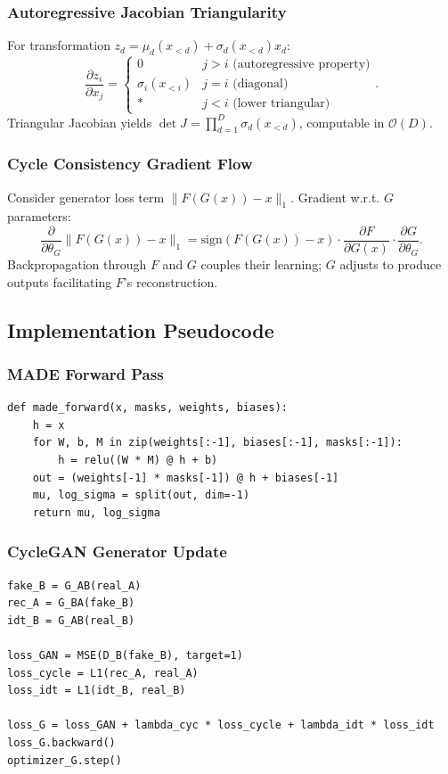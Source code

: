\documentclass[conference]{IEEEtran}
\begin{document}
\subsubsection{Autoregressive Jacobian Triangularity}
For transformation $z_d = \mu_d(x_{<d}) + \sigma_d(x_{<d}) x_d$:
\begin{equation}
\frac{\partial z_i}{\partial x_j} = \begin{cases}
0 & j > i \text{ (autoregressive property)} \\
\sigma_i(x_{<i}) & j = i \text{ (diagonal)} \\
* & j < i \text{ (lower triangular)}
\end{cases}.
\end{equation}
Triangular Jacobian yields $\det J = \prod_{d=1}^{D} \sigma_d(x_{<d})$, computable in $\mathcal{O}(D)$.

\subsubsection{Cycle Consistency Gradient Flow}
Consider generator loss term $\|F(G(x)) - x\|_1$. Gradient w.r.t. $G$ parameters:
\begin{equation}
\frac{\partial}{\partial \theta_G} \|F(G(x)) - x\|_1 = \text{sign}(F(G(x)) - x) \cdot \frac{\partial F}{\partial G(x)} \cdot \frac{\partial G}{\partial \theta_G}.
\end{equation}
Backpropagation through $F$ and $G$ couples their learning; $G$ adjusts to produce outputs facilitating $F$'s reconstruction.

\subsection{Implementation Pseudocode}
\subsubsection{MADE Forward Pass}
\begin{verbatim}
def made_forward(x, masks, weights, biases):
    h = x
    for W, b, M in zip(weights[:-1], biases[:-1], masks[:-1]):
        h = relu((W * M) @ h + b)
    out = (weights[-1] * masks[-1]) @ h + biases[-1]
    mu, log_sigma = split(out, dim=-1)
    return mu, log_sigma
\end{verbatim}

\subsubsection{CycleGAN Generator Update}
\begin{verbatim}
fake_B = G_AB(real_A)
rec_A = G_BA(fake_B)
idt_B = G_AB(real_B)

loss_GAN = MSE(D_B(fake_B), target=1)
loss_cycle = L1(rec_A, real_A)
loss_idt = L1(idt_B, real_B)

loss_G = loss_GAN + lambda_cyc * loss_cycle + lambda_idt * loss_idt
loss_G.backward()
optimizer_G.step()
\end{verbatim}
\end{document}
